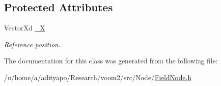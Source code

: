 \subsection*{Protected Attributes}
\begin{DoxyCompactItemize}
\item 
\hypertarget{classvoom_1_1_field_node_aa0eecce8de1392ac78a8b194ef9dfdcb}{
VectorXd \hyperlink{classvoom_1_1_field_node_aa0eecce8de1392ac78a8b194ef9dfdcb}{\_\-X}}
\label{classvoom_1_1_field_node_aa0eecce8de1392ac78a8b194ef9dfdcb}

\begin{DoxyCompactList}\small\item\em Reference position. \item\end{DoxyCompactList}\end{DoxyCompactItemize}


The documentation for this class was generated from the following file:\begin{DoxyCompactItemize}
\item 
/u/home/a/adityapo/Research/voom2/src/Node/\hyperlink{_field_node_8h}{FieldNode.h}\end{DoxyCompactItemize}
